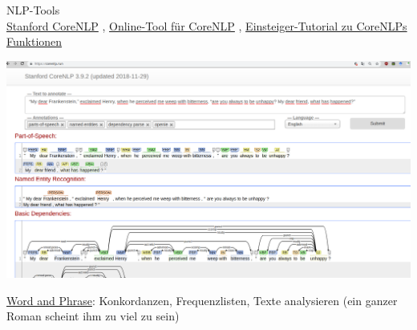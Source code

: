 \documentclass[10pt]{beamer}
\begin{document}
\begin{frame}[allowframebreaks]{NLP-Tools}
 \\
\href{https://stanfordnlp.github.io/CoreNLP/tutorials.html}{Stanford CoreNLP} \sep 
\href{https://corenlp.run/}{Online-Tool für CoreNLP} \sep 
\href{https://interviewbubble.com/getting-started-with-stanford-corenlp/}{Einsteiger-Tutorial zu CoreNLPs Funktionen}

\includegraphics[width=\textwidth]{frankenstein-corenlp.png}


\href{http://www.wordandphrase.info/}{Word and Phrase}: Konkordanzen, Frequenzlisten, Texte analysieren (ein ganzer Roman scheint ihm zu viel zu sein)

\end{frame}
\end{document}
